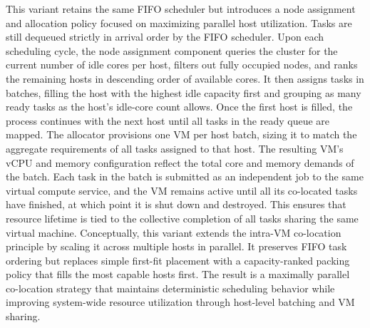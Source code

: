 This variant retains the same FIFO scheduler but introduces a node assignment and allocation policy focused on maximizing parallel host utilization. Tasks are still dequeued strictly in arrival order by the FIFO scheduler. Upon each scheduling cycle, the node assignment component queries the cluster for the current number of idle cores per host, filters out fully occupied nodes, and ranks the remaining hosts in descending order of available cores. It then assigns tasks in batches, filling the host with the highest idle capacity first and grouping as many ready tasks as the host’s idle-core count allows. Once the first host is filled, the process continues with the next host until all tasks in the ready queue are mapped.
The allocator provisions one VM per host batch, sizing it to match the aggregate requirements of all tasks assigned to that host. The resulting VM’s vCPU and memory configuration reflect the total core and memory demands of the batch. Each task in the batch is submitted as an independent job to the same virtual compute service, and the VM remains active until all its co-located tasks have finished, at which point it is shut down and destroyed. This ensures that resource lifetime is tied to the collective completion of all tasks sharing the same virtual machine.
Conceptually, this variant extends the intra-VM co-location principle by scaling it across multiple hosts in parallel. It preserves FIFO task ordering but replaces simple first-fit placement with a capacity-ranked packing policy that fills the most capable hosts first. The result is a maximally parallel co-location strategy that maintains deterministic scheduling behavior while improving system-wide resource utilization through host-level batching and VM sharing.


